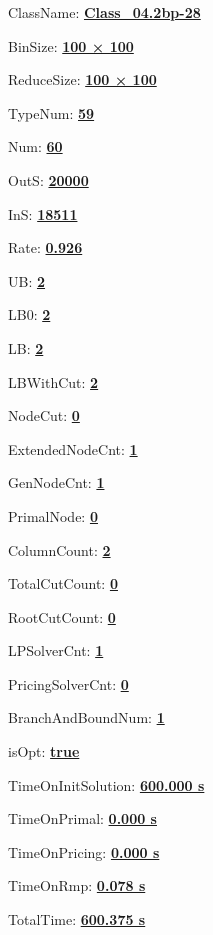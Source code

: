 \documentclass[11pt]{article}
\begin{document}
\pagestyle{empty}


ClassName: \underline{\textbf{Class_04.2bp-28}}
\par
BinSize: \underline{\textbf{100 × 100}}
\par
ReduceSize: \underline{\textbf{100 × 100}}
\par
TypeNum: \underline{\textbf{59}}
\par
Num: \underline{\textbf{60}}
\par
OutS: \underline{\textbf{20000}}
\par
InS: \underline{\textbf{18511}}
\par
Rate: \underline{\textbf{0.926}}
\par
UB: \underline{\textbf{2}}
\par
LB0: \underline{\textbf{2}}
\par
LB: \underline{\textbf{2}}
\par
LBWithCut: \underline{\textbf{2}}
\par
NodeCut: \underline{\textbf{0}}
\par
ExtendedNodeCnt: \underline{\textbf{1}}
\par
GenNodeCnt: \underline{\textbf{1}}
\par
PrimalNode: \underline{\textbf{0}}
\par
ColumnCount: \underline{\textbf{2}}
\par
TotalCutCount: \underline{\textbf{0}}
\par
RootCutCount: \underline{\textbf{0}}
\par
LPSolverCnt: \underline{\textbf{1}}
\par
PricingSolverCnt: \underline{\textbf{0}}
\par
BranchAndBoundNum: \underline{\textbf{1}}
\par
isOpt: \underline{\textbf{true}}
\par
TimeOnInitSolution: \underline{\textbf{600.000 s}}
\par
TimeOnPrimal: \underline{\textbf{0.000 s}}
\par
TimeOnPricing: \underline{\textbf{0.000 s}}
\par
TimeOnRmp: \underline{\textbf{0.078 s}}
\par
TotalTime: \underline{\textbf{600.375 s}}
\par
\newpage
\end{document}
